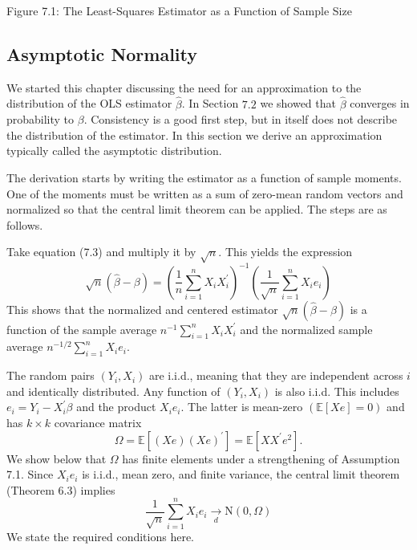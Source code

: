 \documentclass[10pt]{article}
\begin{document}
Figure 7.1: The Least-Squares Estimator as a Function of Sample Size

\subsection{Asymptotic Normality}
We started this chapter discussing the need for an approximation to the distribution of the OLS estimator $\widehat{\beta}$. In Section $7.2$ we showed that $\widehat{\beta}$ converges in probability to $\beta$. Consistency is a good first step, but in itself does not describe the distribution of the estimator. In this section we derive an approximation typically called the asymptotic distribution.

The derivation starts by writing the estimator as a function of sample moments. One of the moments must be written as a sum of zero-mean random vectors and normalized so that the central limit theorem can be applied. The steps are as follows.

Take equation (7.3) and multiply it by $\sqrt{n}$. This yields the expression
$$
\sqrt{n}(\widehat{\beta}-\beta)=\left(\frac{1}{n} \sum_{i=1}^{n} X_{i} X_{i}^{\prime}\right)^{-1}\left(\frac{1}{\sqrt{n}} \sum_{i=1}^{n} X_{i} e_{i}\right)
$$
This shows that the normalized and centered estimator $\sqrt{n}(\widehat{\beta}-\beta)$ is a function of the sample average $n^{-1} \sum_{i=1}^{n} X_{i} X_{i}^{\prime}$ and the normalized sample average $n^{-1 / 2} \sum_{i=1}^{n} X_{i} e_{i}$.

The random pairs $\left(Y_{i}, X_{i}\right)$ are i.i.d., meaning that they are independent across $i$ and identically distributed. Any function of $\left(Y_{i}, X_{i}\right)$ is also i.i.d. This includes $e_{i}=Y_{i}-X_{i}^{\prime} \beta$ and the product $X_{i} e_{i}$. The latter is mean-zero $(\mathbb{E}[X e]=0)$ and has $k \times k$ covariance matrix
$$
\Omega=\mathbb{E}\left[(X e)(X e)^{\prime}\right]=\mathbb{E}\left[X X^{\prime} e^{2}\right] .
$$
We show below that $\Omega$ has finite elements under a strengthening of Assumption 7.1. Since $X_{i} e_{i}$ is i.i.d., mean zero, and finite variance, the central limit theorem (Theorem 6.3) implies
$$
\frac{1}{\sqrt{n}} \sum_{i=1}^{n} X_{i} e_{i} \underset{d}{\longrightarrow} \mathrm{N}(0, \Omega)
$$
We state the required conditions here.
\end{document}
